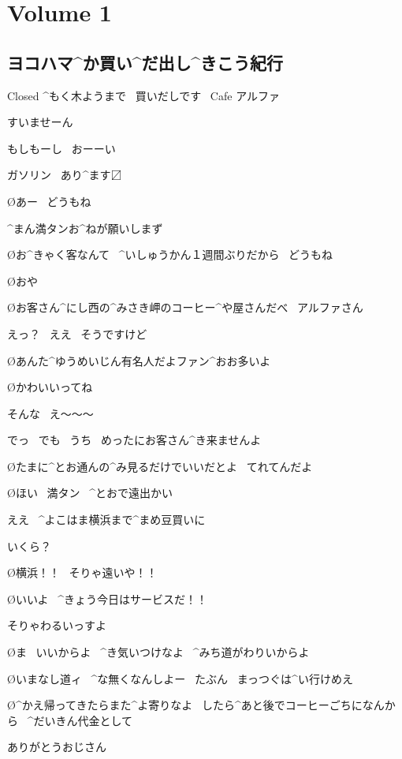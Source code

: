 \section{Volume 1}

\subsection{ヨコハマ^{か}{買}い^{だ}{出}し^{きこう}{紀行}}

\page[9]
\Sign Closed ^{もく}{木}ようまで
\ 買いだしです
\ Cafe アルファ

\page
\A すいませーん

\A もしもーし
\ おーーい

\Sign ガソリン
\ あり^{ます}{〼}

\page
\O あー
\ どうもね

\A ^{まん}{満}タンお^{ねが}{願}いしまず

\O お^{きゃく}{客}なんて
\ ^{いしゅうかん}{１週間}ぶりだから
\ どうもね

\O おや

\page
\O お客さん^{にし}{西}の^{みさき}{岬}のコーヒー^{や}{屋}さんだべ
\ アルファさん

\A えっ？
\ ええ
\ そうですけど

\O あんた^{ゆうめいじん}{有名人}だよファン^{おお}{多}いよ

\O かわいいってね

\A そんな
\ え〜〜〜

\A でっ
\ でも
\ うち
\ めったにお客さん^{き}{来}ませんよ

\O たまに^{とお}{通}んの^{み}{見}るだけでいいだとよ
\ てれてんだよ

\page
\O ほい
\ 満タン
\ ^{とおで}{遠出}かい

\A ええ
\ ^{よこはま}{横浜}まで^{まめ}{豆}買いに

\A いくら？

\O 横浜！！
\ そりゃ遠いや！！

\O いいよ
\ ^{きょう}{今日}はサービスだ！！

\A そりゃわるいっすよ

\O ま
\ いいからよ
\ ^{き}{気}いつけなよ
\ ^{みち}{道}がわりいからよ

\O いまなし道ィ
\ ^{な}{無}くなんしよー
\ たぶん
\ まっつぐは^{い}{行}けめえ

\page
\O ^{かえ}{帰}ってきたらまた^{よ}{寄}りなよ
\ したら^{あと}{後}でコーヒーごちになんから
\ ^{だいきん}{代金}として

\A ありがとうおじさん

